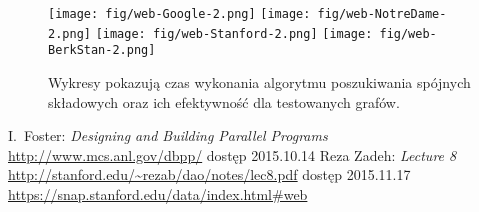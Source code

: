 \documentclass[a4paper; 12pt]{article}
\begin{document}
\begin{figure}
    \centering
    \texttt{[image: fig/web-Google-2.png]}
    \texttt{[image: fig/web-NotreDame-2.png]}
    \texttt{[image: fig/web-Stanford-2.png]}
    \texttt{[image: fig/web-BerkStan-2.png]}
    \caption{Wykresy pokazują czas wykonania algorytmu poszukiwania spójnych
        składowych oraz ich efektywność dla testowanych grafów.}
    \label{fig:web-graphs-2}
\end{figure}

\begin{thebibliography}{9}
        I.~Foster: \emph{Designing and Building Parallel Programs}
        \url{http://www.mcs.anl.gov/dbpp/} dostęp 2015.10.14
        Reza Zadeh: \emph{Lecture 8}
        \url{http://stanford.edu/~rezab/dao/notes/lec8.pdf} dostęp 2015.11.17
        \url{https://snap.stanford.edu/data/index.html#web}
\end{thebibliography}
\end{document}
